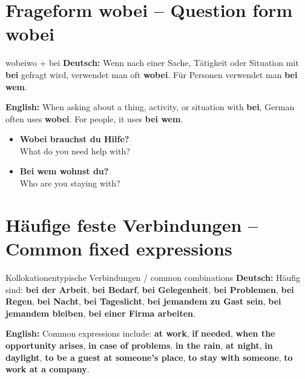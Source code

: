 \documentclass[a4paper,11pt]{article}
\newcommand{\GermanText}[1]{\textbf{Deutsch: }#1\par}
\newcommand{\EnglishText}[1]{{\small\color{SoftGray}\textbf{English: }#1\par}}
\newcommand{\ExampleItem}[2]{\item \textbf{#1}\\{\small\color{SoftGray}#2}}
\begin{document}
\section{Frageform wobei -- Question form wobei}
\begin{grammarentry}{wobei}{wo + bei}
\GermanText{Wenn nach einer Sache, Tätigkeit oder Situation mit \textbf{bei} gefragt wird, verwendet man oft \textbf{wobei}. Für Personen verwendet man \textbf{bei wem}.}
\EnglishText{When asking about a thing, activity, or situation with \textbf{bei}, German often uses \textbf{wobei}. For people, it uses \textbf{bei wem}.}
\end{grammarentry}
\begin{exbox}\begin{itemize}
\ExampleItem{Wobei brauchst du Hilfe?}{What do you need help with?}
\ExampleItem{Bei wem wohnst du?}{Who are you staying with?}
\end{itemize}\end{exbox}

\section{Häufige feste Verbindungen -- Common fixed expressions}
\begin{grammarentry}{Kollokationen}{typische Verbindungen / common combinations}
\GermanText{Häufig sind: \textbf{bei der Arbeit}, \textbf{bei Bedarf}, \textbf{bei Gelegenheit}, \textbf{bei Problemen}, \textbf{bei Regen}, \textbf{bei Nacht}, \textbf{bei Tageslicht}, \textbf{bei jemandem zu Gast sein}, \textbf{bei jemandem bleiben}, \textbf{bei einer Firma arbeiten}.}
\EnglishText{Common expressions include: \textbf{at work}, \textbf{if needed}, \textbf{when the opportunity arises}, \textbf{in case of problems}, \textbf{in the rain}, \textbf{at night}, \textbf{in daylight}, \textbf{to be a guest at someone's place}, \textbf{to stay with someone}, \textbf{to work at a company}.}
\end{grammarentry}
\end{document}
